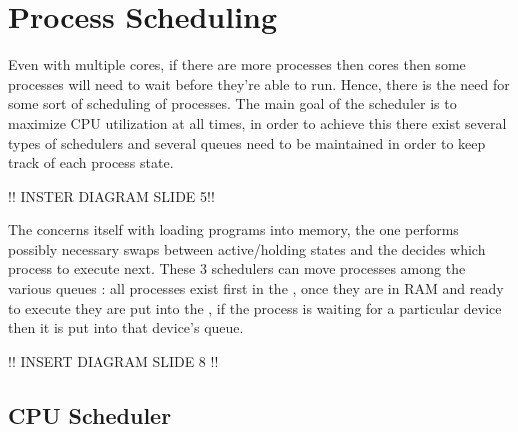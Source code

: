 \section{Process Scheduling}








	\par{Even with multiple cores, if there are more processes then cores then some processes will need to wait before they're able to run. Hence, there is the need for some sort of scheduling of processes. The main goal of the scheduler is to maximize CPU utilization at all times, in order to achieve this there exist several types of schedulers and several queues need to be maintained in order to keep track of each process state.}

	!! INSTER DIAGRAM SLIDE 5!!

	\par{The  concerns itself with loading programs into memory, the  one performs possibly necessary swaps between active/holding states and the  decides which process to execute next. These 3 schedulers can move processes among the various queues : all processes exist first in the , once they are in RAM and ready to execute they are put into the , if the process is waiting for a particular device then it is put into that device's queue.} 

	!! INSERT DIAGRAM SLIDE 8 !!

	\subsection{CPU Scheduler}

